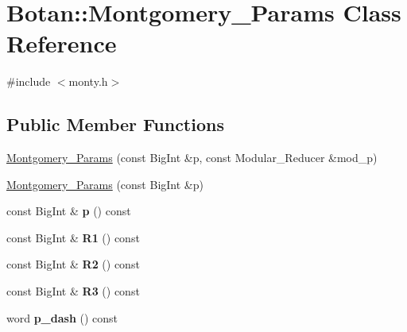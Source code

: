 \hypertarget{class_botan_1_1_montgomery___params}{}\section{Botan\+:\+:Montgomery\+\_\+\+Params Class Reference}
\label{class_botan_1_1_montgomery___params}


{\ttfamily \#include $<$monty.\+h$>$}

\subsection*{Public Member Functions}
\begin{DoxyCompactItemize}
\item 
\mbox{\hyperlink{class_botan_1_1_montgomery___params_a95369b9cae36b8b775035caf2bbb020c}{Montgomery\+\_\+\+Params}} (const Big\+Int \&p, const Modular\+\_\+\+Reducer \&mod\+\_\+p)
\item 
\mbox{\hyperlink{class_botan_1_1_montgomery___params_a601d7bb782f3d718f68ffaed95e216df}{Montgomery\+\_\+\+Params}} (const Big\+Int \&p)
\item 
\mbox{\label{class_botan_1_1_montgomery___params_a0d556b89b82fc41720f37b9092bc875d}} 
const Big\+Int \& {\bfseries p} () const
\item 
\mbox{\label{class_botan_1_1_montgomery___params_a2330350ab7a55e5f56c34a806f879d3e}} 
const Big\+Int \& {\bfseries R1} () const
\item 
\mbox{\label{class_botan_1_1_montgomery___params_a9bf0665f65e17f946569b90f91c0bf43}} 
const Big\+Int \& {\bfseries R2} () const
\item 
\mbox{\label{class_botan_1_1_montgomery___params_a9c06b32e68c8fcc28f46683145f730dc}} 
const Big\+Int \& {\bfseries R3} () const
\item 
\mbox{\label{class_botan_1_1_montgomery___params_af0f2c6567a8fecd9028d8611ed5383a8}} 
word {\bfseries p\+\_\+dash} () const
\item 
\mbox{\label{class_botan_1_1_montgomery___params_a5ec2a1e82b7b23aebe81773434d3e50d}} 

\end{DoxyCompactItemize}
